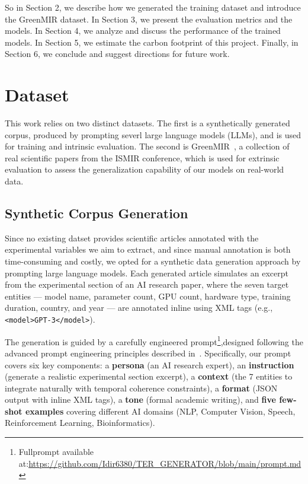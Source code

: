 \documentclass{article}
\theoremstyle{plain}
\theoremstyle{definition}
\theoremstyle{remark}
\begin{document}
So in Section 2, we describe how we generated the training dataset and introduce the GreenMIR dataset. In Section 3, we present the evaluation metrics and the models. In Section 4, we analyze and discuss the performance of the trained models. In Section 5, we estimate the carbon footprint of this project. Finally, in Section 6, we conclude and suggest directions for future work.

\section{Dataset}
This work relies on two distinct datasets. The first is a synthetically generated corpus, produced by prompting severl large language models (LLMs), and is used for training and intrinsic evaluation. The second is GreenMIR~\cite{holzapfel2024green}, a collection of real scientific papers from the ISMIR conference, which is used for extrinsic evaluation to assess the generalization capability of our models on real-world data.

\subsection{Synthetic Corpus Generation} 
Since no existing datset provides scientific articles annotated with the experimental variables we aim to extract, and since manual annotation is both time-consuming and costly, we opted for a synthetic data generation approach by prompting large language models. Each generated article simulates an excerpt from the experimental section of an AI research paper, where the seven target entities — model name, parameter count, GPU count, hardware type, training duration, country, and year — are annotated inline using XML tags (e.g., \texttt{<model>GPT-3</model>}).

The generation is guided by a carefully engineered prompt\footnote{Fullprompt available at:\url{https://github.com/Idir6380/TER_GENERATOR/blob/main/prompt.md}},designed following the advanced prompt engineering principles described in~\cite{alammar2024hands}. Specifically, our prompt covers six key components: a \textbf{persona} (an AI research expert), an \textbf{instruction} (generate a realistic experimental section excerpt), a \textbf{context} (the 7 entities to integrate naturally with temporal coherence constraints), a \textbf{format} (JSON output with inline XML tags), a \textbf{tone} (formal academic writing), and \textbf{five few-shot examples} covering different AI domains (NLP, Computer Vision, Speech, Reinforcement Learning, Bioinformatics).
\end{document}
